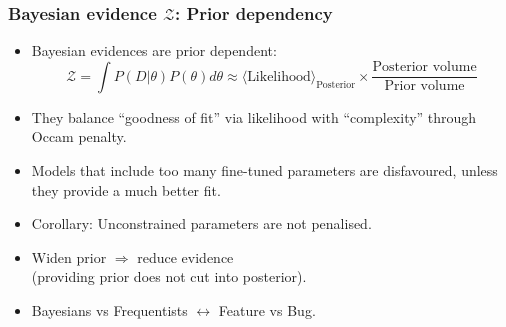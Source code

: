 \documentclass[%
]{beamer}
\begin{document}

\begin{frame}
    \frametitle{Bayesian evidence $\mathcal{Z}$: Prior dependency}
    \begin{itemize}
        \item Bayesian evidences are prior dependent:
            \[
                \mathcal{Z} = \int P(D|\theta)P(\theta) d\theta \approx \langle\text{Likelihood}\rangle_\text{Posterior} \times \frac{\text{Posterior volume}}{\text{Prior volume}}
            \]
        \item They balance ``goodness of fit'' via likelihood with ``complexity'' through Occam penalty.
        \item Models that include too many fine-tuned parameters are disfavoured, unless they provide a much better fit.
        \item Corollary: Unconstrained parameters are not penalised.
        \item Widen prior $\Rightarrow$ reduce evidence \\ (providing prior does not cut into posterior).
        \item Bayesians vs Frequentists $\leftrightarrow$ Feature vs Bug.
    \end{itemize}
\end{frame}
\end{document}
